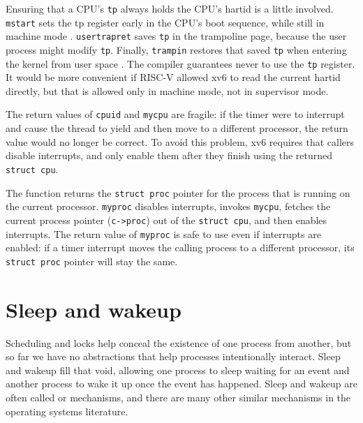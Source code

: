 Ensuring that a CPU's \lstinline{tp} always holds the CPU's
hartid is a little involved. \lstinline{mstart} sets the tp
register early in the CPU's boot sequence, while still in machine mode
.
\lstinline{usertrapret} saves \lstinline{tp} in the trampoline
page, because the user process might modify \lstinline{tp}.
Finally, \lstinline{trampin} restores that saved \lstinline{tp}
when entering the kernel from user space
.
The compiler guarantees never to use the \lstinline{tp}
register.
It would be more convenient if RISC-V allowed xv6 to read the
current hartid directly, but that is allowed only in
machine mode, not in supervisor mode.

The return values of
\lstinline{cpuid}
and
\lstinline{mycpu}
are fragile: if the timer were to interrupt and cause
the thread to yield and then move to a different processor, the
return value would no longer be correct.
To avoid this problem, xv6 requires that callers 
disable interrupts, and only enable
them after they finish using the returned
\lstinline{struct cpu}.

The function
returns the
\lstinline{struct proc}
pointer
for the process that is running on the current processor.
\lstinline{myproc}
disables interrupts, invokes
\lstinline{mycpu},
fetches the current process pointer
(\lstinline{c->proc})
out of the
\lstinline{struct cpu},
and then enables interrupts.
The return value of
\lstinline{myproc}
is safe to use even if interrupts are enabled:
if a timer interrupt moves the calling process to a
different processor, its
\lstinline{struct proc}
pointer will stay the same.
\section{Sleep and wakeup}

Scheduling and locks help conceal the existence of one process
from another,
but so far we have no abstractions that help
processes intentionally interact.
Sleep and wakeup fill that void, allowing one process to 
sleep waiting for an event and another process to wake it up
once the event has happened.
Sleep and wakeup are often called 
or 
mechanisms, and there are many other similar mechanisms
in the operating systems literature.


